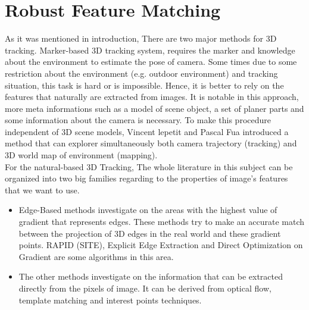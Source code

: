 \chapter{Robust Feature Matching}\label{chapter:Robust Feature Matching}
As it was mentioned in introduction, There are two major methods for 3D tracking. Marker-based 3D tracking system, requires the marker and knowledge about the environment to estimate the pose of camera. Some times due to some restriction about the environment (e.g. outdoor environment) and tracking situation, this task is hard or is impossible. Hence, it is better to rely on the features that naturally are extracted from images. It is notable in this approach, more meta informations such as a model of scene object, a set of planer parts and some information about the camera is necessary. To make this procedure independent of 3D scene models, Vincent lepetit and Pascal Fua \cite{lepetit2005monocular} introduced a method that can explorer simultaneously both camera trajectory (tracking) and 3D world map of environment (mapping). \\
For the natural-based 3D Tracking, The whole literature in this subject can be organized into two big families regarding to the properties of image's features that we want to use.
\begin{itemize}
\item Edge-Based methods investigate on the areas with the highest value of gradient that represents edges. These methods try to make an accurate match between the projection of 3D edges in the real world and these gradient points. RAPID (SITE), Explicit Edge Extraction and Direct Optimization on Gradient are some algorithms in this area. 
\item The other methods investigate on the information that can be extracted directly from the pixels of image. It can be derived from optical flow, template matching and interest points techniques.
\end{itemize}

